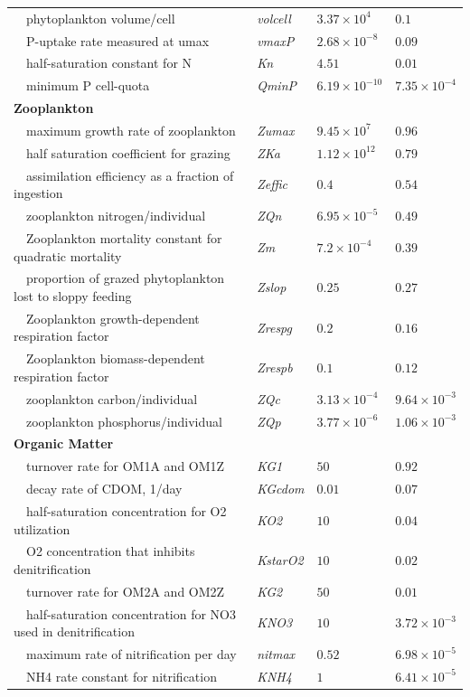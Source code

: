 \documentclass[review]{elsarticle}\usepackage[]{graphicx}\usepackage[]{color}
\begin{document}
\begin{table}[!tbp]
{\begin{center}
\begin{tabular}{llll}
~~phytoplankton volume/cell&\textit{volcell}&$3.37\times 10^{4}$&$0.1$\tabularnewline
~~P-uptake rate measured at umax&\textit{vmaxP}&$2.68\times 10^{-8}$&$0.09$\tabularnewline
~~half-saturation constant for N&\textit{Kn}&$4.51$&$0.01$\tabularnewline
~~minimum P cell-quota&\textit{QminP}&$6.19\times 10^{-10}$&$7.35\times 10^{-4}$\tabularnewline
\hline
{\bfseries Zooplankton}&&&\tabularnewline
~~maximum growth rate of zooplankton&\textit{Zumax}&$9.45\times 10^{7}$&$0.96$\tabularnewline
~~half saturation coefficient for grazing&\textit{ZKa}&$1.12\times 10^{12}$&$0.79$\tabularnewline
~~assimilation efficiency as a fraction of ingestion&\textit{Zeffic}&$0.4$&$0.54$\tabularnewline
~~zooplankton nitrogen/individual&\textit{ZQn}&$6.95\times 10^{-5}$&$0.49$\tabularnewline
~~Zooplankton mortality constant for quadratic mortality&\textit{Zm}&$7.2\times 10^{-4}$&$0.39$\tabularnewline
~~proportion of grazed phytoplankton lost to sloppy feeding&\textit{Zslop}&$0.25$&$0.27$\tabularnewline
~~Zooplankton growth-dependent respiration factor&\textit{Zrespg}&$0.2$&$0.16$\tabularnewline
~~Zooplankton biomass-dependent respiration factor&\textit{Zrespb}&$0.1$&$0.12$\tabularnewline
~~zooplankton carbon/individual&\textit{ZQc}&$3.13\times 10^{-4}$&$9.64\times 10^{-3}$\tabularnewline
~~zooplankton phosphorus/individual&\textit{ZQp}&$3.77\times 10^{-6}$&$1.06\times 10^{-3}$\tabularnewline
\hline
{\bfseries Organic Matter}&&&\tabularnewline
~~turnover rate for OM1A and OM1Z&\textit{KG1}&$50$&$0.92$\tabularnewline
~~decay rate of CDOM, 1/day&\textit{KGcdom}&$0.01$&$0.07$\tabularnewline
~~half-saturation concentration for O2 utilization&\textit{KO2}&$10$&$0.04$\tabularnewline
~~O2 concentration that inhibits denitrification&\textit{KstarO2}&$10$&$0.02$\tabularnewline
~~turnover rate for OM2A and OM2Z&\textit{KG2}&$50$&$0.01$\tabularnewline
~~half-saturation concentration for NO3 used in denitrification&\textit{KNO3}&$10$&$3.72\times 10^{-3}$\tabularnewline
~~maximum rate of nitrification per day&\textit{nitmax}&$0.52$&$6.98\times 10^{-5}$\tabularnewline
~~NH4 rate constant for nitrification&\textit{KNH4}&$1$&$6.41\times 10^{-5}$\tabularnewline
\hline
\end{tabular}\end{center}}
\end{table}
\end{document}
